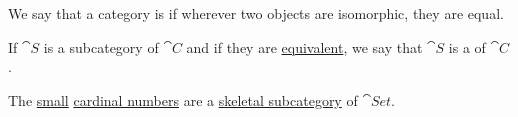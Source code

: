 \begin{definition}\label{def:skeletal_category}
  We say that a category is  if wherever two objects are isomorphic, they are equal.

  If \( \cat{S} \) is a subcategory of \( \cat{C} \) and if they are \hyperref[def:category_equivalence]{equivalent}, we say that \( \cat{S} \) is a  of \( \cat{C} \).
\end{definition}

\begin{example}\label{ex:skeleton_of_set}
  The \hyperref[def:small_set]{small} \hyperref[def:cardinal]{cardinal numbers} are a \hyperref[def:skeletal_category]{skeletal subcategory} of \( \cat{Set} \).
\end{example}

